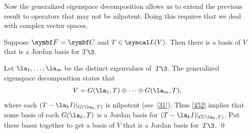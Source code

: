 
Now the generalized eigenspace decomposition allows us to extend the previous result to operators that may not be nilpotent. Doing this requires that we deal with complex vector spaces.

{Suppose $\F{} = \C{}$ and $T \in \L(V)$. Then there is a
basis of $V$ that is a Jordan basis for $T\3$.}

\proof
Let $\la_1, \dots, \la_m$ be the distinct eigenvalues of~$T\3$. The generalized eigenspace decomposition states that
\[
V = G(\la_1, T) \oplus \dots \oplus G(\la_m, T),
\]
where each $(T - \la_k I)|_{G(\la_k, T)}$ is nilpotent (see~\ref{31}).  Thus \ref{452} implies that some basis of each $G(\la_k, T)$ is a Jordan basis for $(T - \la_k I)|_{G(\la_k, T)}$. Put these bases together to get a basis of $V$ that is a Jordan basis for~$T\3$.
\qed


